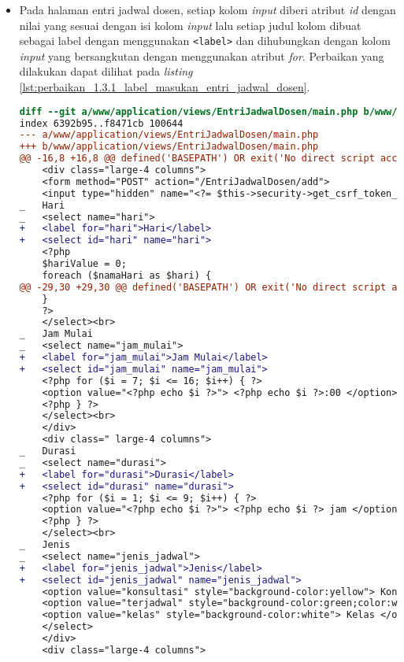 \begin{itemize}
\item Pada halaman entri jadwal dosen, setiap kolom \textit{input} diberi atribut \textit{id} dengan nilai yang sesuai dengan isi kolom \textit{input} lalu setiap judul kolom dibuat sebagai label dengan menggunakan \texttt{<label>} dan dihubungkan dengan kolom \textit{input} yang bersangkutan dengan menggunakan atribut \textit{for}. Perbaikan yang dilakukan dapat dilihat pada \textit{listing} \ref{lst:perbaikan_1.3.1_label_masukan_entri_jadwal_dosen}.
\begin{lstlisting}[frame=single, label={lst:perbaikan_1.3.1_label_masukan_entri_jadwal_dosen}, language=diff, caption=Perbaikan Kriteria Sukses 1.3.1 pada Kolom \textit{Input} di Halaman Entri Jadwal Dosen]
diff --git a/www/application/views/EntriJadwalDosen/main.php b/www/application/views/EntriJadwalDosen/main.php
index 6392b95..f8471cb 100644
--- a/www/application/views/EntriJadwalDosen/main.php
+++ b/www/application/views/EntriJadwalDosen/main.php
@@ -16,8 +16,8 @@ defined('BASEPATH') OR exit('No direct script access allowed');
    <div class="large-4 columns">
    <form method="POST" action="/EntriJadwalDosen/add">
    <input type="hidden" name="<?= $this->security->get_csrf_token_name() ?>" value="<?= $this->security->get_csrf_hash() ?>" />
_   Hari
_   <select name="hari"> 
+   <label for="hari">Hari</label>
+   <select id="hari" name="hari">
    <?php
    $hariValue = 0;
    foreach ($namaHari as $hari) {
@@ -29,30 +29,30 @@ defined('BASEPATH') OR exit('No direct script access allowed');
    }
    ?>
    </select><br>
_   Jam Mulai
_   <select name="jam_mulai"> 
+   <label for="jam_mulai">Jam Mulai</label>
+   <select id="jam_mulai" name="jam_mulai"> 
    <?php for ($i = 7; $i <= 16; $i++) { ?>
    <option value="<?php echo $i ?>"> <?php echo $i ?>:00 </option>
    <?php } ?>
    </select><br>
    </div>
    <div class=" large-4 columns">
_   Durasi
_   <select name="durasi"> 
+   <label for="durasi">Durasi</label>
+   <select id="durasi" name="durasi"> 
    <?php for ($i = 1; $i <= 9; $i++) { ?>
    <option value="<?php echo $i ?>"> <?php echo $i ?> jam </option>
    <?php } ?>
    </select><br>
_   Jenis  
_   <select name="jenis_jadwal"> 
+   <label for="jenis_jadwal">Jenis</label>
+   <select id="jenis_jadwal" name="jenis_jadwal"> 
    <option value="konsultasi" style="background-color:yellow"> Konsultasi </option>
    <option value="terjadwal" style="background-color:green;color:white"> Terjadwal</option>
    <option value="kelas" style="background-color:white"> Kelas </option>
    </select>
    </div>
    <div class="large-4 columns">

\end{lstlisting}
\end{itemize}
